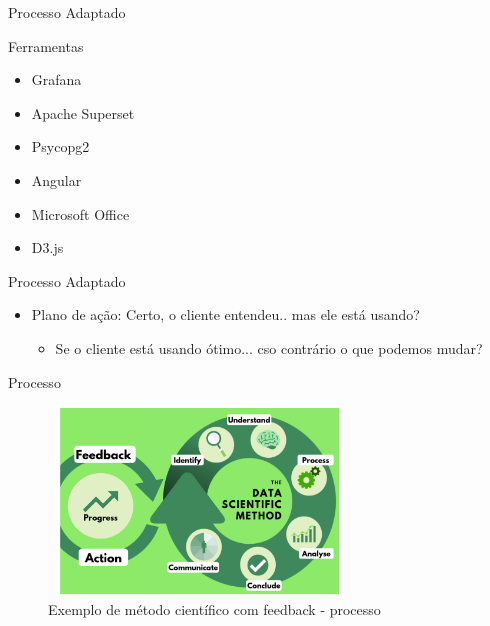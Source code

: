     
\begin{frame}
	\begin{block}{Processo Adaptado}
	
		Ferramentas
		\begin{itemize}
			\item Grafana
			\item Apache Superset
			\item Psycopg2
			\item Angular
			\item Microsoft Office
			\item D3.js
		\end{itemize}
	\end{block}
\end{frame}



\begin{frame}
	\begin{block}{Processo Adaptado}
		\begin{itemize}
			\item Plano de ação: Certo, o cliente entendeu.. mas ele está usando?		
				\begin{itemize}
					\item Se o cliente está usando ótimo... cso contrário o que podemos mudar?					
				\end{itemize}		
		\end{itemize}
	\end{block}
\end{frame}


\begin{frame}
	\begin{block}{Processo}
		\begin{figure}[!htb]
			\centering	  				
			\includegraphics[height=5cm, width = 8cm]{./pic/metodoAdaptadoFeedback.png}
			\caption{Exemplo de método científico com feedback - processo}
		\end{figure}
	\end{block}
\end{frame}



